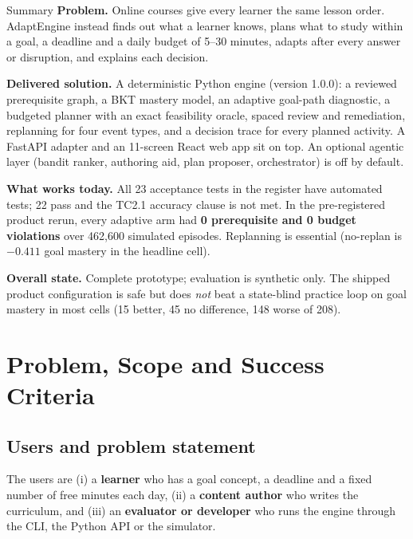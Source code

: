 \documentclass[11pt,a4paper]{article}
\begin{document}
\begin{keybox}{Summary}
\textbf{Problem.} Online courses give every learner the same lesson order. AdaptEngine instead finds out what a learner knows, plans what to study within a goal, a deadline and a daily budget of 5--30 minutes, adapts after every answer or disruption, and explains each decision.

\textbf{Delivered solution.} A deterministic Python engine (version 1.0.0): a reviewed prerequisite graph, a BKT mastery model, an adaptive goal-path diagnostic, a budgeted planner with an exact feasibility oracle, spaced review and remediation, replanning for four event types, and a decision trace for every planned activity. A FastAPI adapter and an 11-screen React web app sit on top. An optional agentic layer (bandit ranker, authoring aid, plan proposer, orchestrator) is off by default.

\textbf{What works today.} All 23 acceptance tests in the register have automated tests; 22 pass and the TC2.1 accuracy clause is not met. In the pre-registered product rerun, every adaptive arm had \textbf{0 prerequisite and 0 budget violations} over 462,600 simulated episodes. Replanning is essential (no-replan is $-0.411$ goal mastery in the headline cell).

\textbf{Overall state.} Complete prototype; evaluation is synthetic only. The shipped product configuration is safe but does \emph{not} beat a state-blind practice loop on goal mastery in most cells (15 better, 45 no difference, 148 worse of 208).
\end{keybox}

\tableofcontents
\newpage

\section{Problem, Scope and Success Criteria}

\subsection{Users and problem statement}

The users are (i) a \textbf{learner} who has a goal concept, a deadline and a fixed number of free minutes each day, (ii) a \textbf{content author} who writes the curriculum, and (iii) an \textbf{evaluator or developer} who runs the engine through the CLI, the Python API or the simulator.
\end{document}
